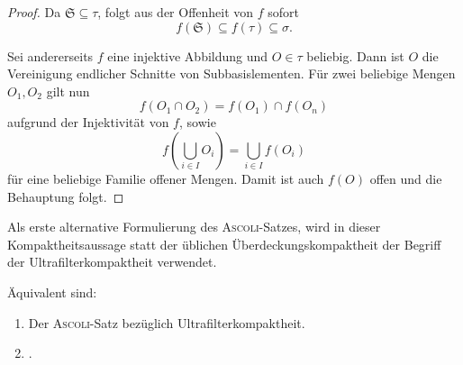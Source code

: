 \begin{proof}
  Da $\mathfrak{S} \subseteq \tau$, folgt aus der Offenheit von $f$ sofort 
  \begin{displaymath}
    f(\mathfrak{S}) \subseteq f(\tau) \subseteq \sigma.
  \end{displaymath}

  Sei andererseits $f$ eine injektive Abbildung und $O \in \tau$ beliebig.
  Dann ist $O$ die Vereinigung endlicher Schnitte von Subbasislementen.
  Für zwei beliebige Mengen $O_1,O_2$ gilt nun 
  \begin{displaymath}
    f(O_1 \cap O_2) = f(O_1) \cap f(O_n)
  \end{displaymath}
  aufgrund der Injektivität von $f$, sowie 
  \begin{displaymath}
    f \left(\bigcup_{i \in I} O_i \right) = \bigcup_{i \in I} f(O_i)
  \end{displaymath}
  für eine beliebige Familie offener Mengen.
  Damit ist auch $f(O)$ offen und die Behauptung folgt.
\end{proof}

Als erste alternative Formulierung des \textsc{Ascoli}\hyp{}Satzes, wird in dieser Kompaktheitsaussage statt der üblichen Überdeckungskompaktheit der Begriff der Ultrafilterkompaktheit verwendet.

\begin{thm}
  \label{thm:ultrafiltercompact}
  Äquivalent sind:
  \begin{enumerate}[(1)]
    \item Der \textsc{Ascoli}-Satz bezüglich Ultrafilterkompaktheit.
    \item \PIT.
  \end{enumerate}
\end{thm}


